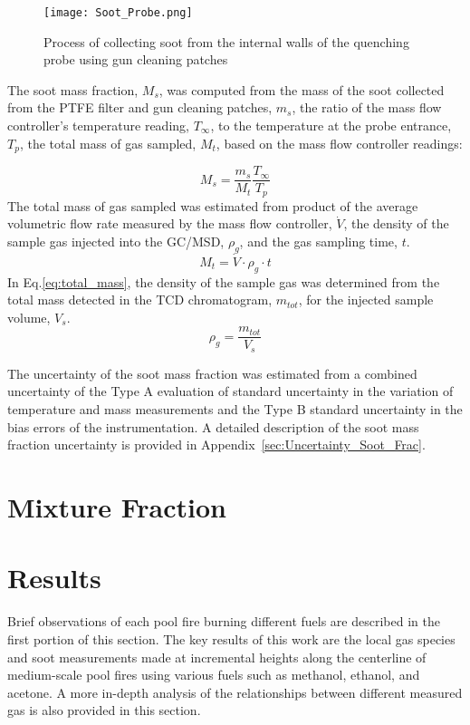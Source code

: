 \documentclass[12pt]{article}
\begin{document}
\begin{figure}[ht!]
	\centering
\texttt{[image: Soot\_Probe.png]}
	\caption[Process for cleaning soot probe]{Process of collecting soot from the internal walls of the quenching probe using gun cleaning patches}
	\label{fig:Soot_Probe_Setup}
\end{figure}

The soot mass fraction, $M_{s}$, was computed from the mass of the soot collected from the PTFE filter and gun cleaning patches, $m_{s}$, the ratio of the mass flow controller's temperature reading, $T_{\infty}$, to the temperature at the probe entrance,$T_{p}$, the total mass of gas sampled, $M_{t}$, based on the mass flow controller readings:

\begin{equation}\label{eq:soot_mass_frac}
  M_{s}= \frac{m_{s}}{M_{t}}\frac{T_{\infty}}{T_{p}}
\end{equation}
The total mass of gas sampled was estimated from product of the average volumetric flow rate measured by the mass flow controller, $\dot{V}$, the density of the sample gas injected into the GC/MSD, $\rho_{g}$, and the gas sampling time, $t$. 
\begin{equation}\label{eq:total_mass}
M_{t}= \dot{V}\cdot \rho_{g}\cdot t
\end{equation} 
In Eq.\ref{eq:total_mass}, the density of the sample gas was determined from the total mass detected in the TCD chromatogram, $m_{tot}$, for the injected sample volume, $V_{s}$. 
\begin{equation}\label{eq:gas_density}
\rho_{g}= \frac{m_{tot}}{V_{s}}
\end{equation} 

The uncertainty of the soot mass fraction was estimated from a combined uncertainty of the Type A evaluation of standard uncertainty in the variation of temperature and mass measurements and the Type B standard uncertainty in the bias errors of the instrumentation. A detailed description of the soot mass fraction uncertainty is provided in Appendix~\ref{sec:Uncertainty_Soot_Frac}.

\section{Mixture Fraction}
\label{sec:Mixture_Fraction}

\section{Results}
\label{sec:Results}
Brief observations of each pool fire burning different fuels are described in the first portion of this section. The key results of this work are the local gas species and soot measurements made at incremental heights along the centerline of medium-scale pool fires using various fuels such as methanol, ethanol, and acetone. A more in-depth analysis of the relationships between different measured gas is also provided in this section.
\end{document}
